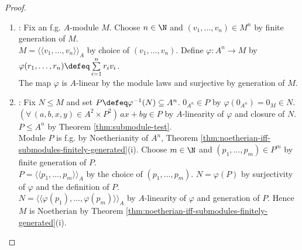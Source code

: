 \begin{theorem}
\begin{proof}
\begin{enumerate}[label=\roman*.]
\begin{enumerate}[label=(\alph*)]
Fix $s\in S$. Choose $(a_1,\ldots,a_q)\in A^q$ satisfying $\pi(s)=\sum\limits_{j=1}^{q}a_jt_j$ by generation of $\pi(S)$.\\
Set $u\defeq s-\sum\limits_{j=1}^{q}a_js_j\in\ker\pi$ by $A$-linearity of $\pi$ and the preceding equality. Write $u=(k,0_A)$ with $k\in K$.\\
Choose $(b_1,\ldots,b_p)\in A^p$ satisfying $k=\sum\limits_{i=1}^{p}b_ik_i$ by generation of $K$.\\
$s=\sum\limits_{j=1}^{q}a_js_j+\sum\limits_{i=1}^{p}b_i(k_i,0_A)$ by the defining equations for $u,k$, and $(b_i)_{i=1}^{p}$.\\
Thus $S$ is f.g. by arbitrariness of $s$, closure of $S$, and Definition \ref{def:cyclic-and-finitely-generated-modules}(ii).\\
$Q(n+1)$ holds by arbitrariness of $S$; $(\forall\,n\in\N)\,Q(n)$ by Theorem \ref{thm:mathematical-induction}; $(\forall\,n\in\N)\,[A^n\text{ is Noetherian}]$ by Theorem \ref{thm:noetherian-iff-submodules-finitely-generated}(i).
\item {}: Fix an f.g. $A$-module $M$. Choose $n\in\N$ and $(v_1,\ldots,v_n)\in M^n$ by finite generation of $M$.\\
$M=\langle\!\langle v_1,\ldots,v_n\rangle\!\rangle_A$ by choice of $(v_1,\ldots,v_n)$. Define $\varphi:A^n\to M$ by $\varphi(r_1,\ldots,r_n)\defeq\sum\limits_{i=1}^{n}r_iv_i$.\\
The map $\varphi$ is $A$-linear by the module laws and surjective by generation of $M$.
\item {}: Fix $N\leq M$ and set $P\defeq\varphi^{-1}(N)\subseteq A^n$. $0_{A^n}\in P$ by $\varphi(0_{A^n})=0_M\in N$.\\
$(\forall\,(a,b,x,y)\in A^2\times P^2)\,ax+by\in P$ by $A$-linearity of $\varphi$ and closure of $N$. $P\leq A^n$ by Theorem \ref{thm:submodule-test}.\\
Module $P$ is f.g. by Noetherianity of $A^n$, Theorem \ref{thm:noetherian-iff-submodules-finitely-generated}(i). Choose $m\in\N$ and $(p_1,\ldots,p_m)\in P^m$ by finite generation of $P$.\\
$P=\langle\!\langle p_1,\ldots,p_m\rangle\!\rangle_A$ by the choice of $(p_1,\ldots,p_m)$. $N=\varphi(P)$ by surjectivity of $\varphi$ and the definition of $P$.\\
$N=\langle\!\langle\varphi(p_1),\ldots,\varphi(p_m)\rangle\!\rangle_A$ by $A$-linearity of $\varphi$ and generation of $P$. Hence $M$ is Noetherian by Theorem \ref{thm:noetherian-iff-submodules-finitely-generated}(i).\\

\end{enumerate}
\end{enumerate}
\end{proof}
\end{theorem}
